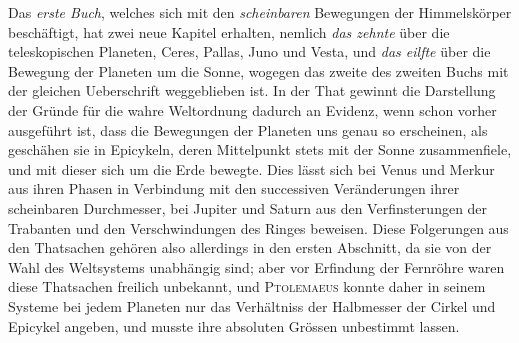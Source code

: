 Das \emph{erste Buch}, welches sich mit den \emph{scheinbaren} Bewegungen der Himmelskörper beschäftigt, hat zwei neue Kapitel erhalten, nemlich \emph{das zehnte} über die teleskopischen Planeten, Ceres, Pallas, Juno und Vesta, und \emph{das eilfte} über die Bewegung der Planeten um die Sonne, wogegen das zweite des zweiten Buchs mit der gleichen Ueberschrift weggeblieben ist. In der That gewinnt die Darstellung der Gründe für die wahre Weltordnung dadurch an Evidenz, wenn schon vorher ausgeführt ist, dass die Bewegungen der Planeten uns genau so erscheinen, als geschähen sie in Epicykeln, deren Mittelpunkt stets mit der Sonne zusammenfiele, und mit dieser sich um die Erde bewegte. Dies lässt sich bei Venus und Merkur aus ihren Phasen in Verbindung mit den successiven Veränderungen ihrer scheinbaren Durchmesser, bei Jupiter und Saturn aus den Verfinsterungen der Trabanten und den Verschwindungen des Ringes beweisen. Diese Folgerungen aus den Thatsachen gehören also allerdings in den ersten Abschnitt, da sie von der Wahl des Weltsystems unabhängig sind; aber vor Erfindung der Fernröhre waren diese Thatsachen freilich unbekannt, und \textsc{Ptolemaeus} konnte daher in seinem Systeme bei jedem Planeten nur das Verhältniss der Halbmesser der Cirkel und Epicykel angeben, und musste ihre absoluten Grössen unbestimmt lassen.

